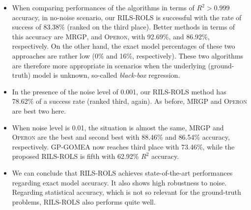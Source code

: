 \documentclass{bmcart}
\begin{document}
\begin{itemize}
	\item When comparing performances of the algorithms in terms of $R^2 > 0.999$ accuracy, in no-noise scenario, our \textsc{RILS}-\textsc{ROLS} is successful with the rate of success of 83.38\% (ranked on the third place). Better methods in terms of this accuracy are \textsc{MRGP}, and \textsc{Operon}, with 92.69\%, and 86.92\%, respectively. On the other hand, the exact model percentages of these two approaches are rather low (0\% and 16\%, respectively). These two algorithms are therefore more appropriate in scenarios when the underlying (ground-truth) model is unknown, so-called \emph{black-box} regression. 
	
	\item  In the presence of the noise level of 0.001, our \textsc{RILS-ROLS} method has 78.62\% of a success rate (ranked third, again).  As before, \textsc{MRGP} and \textsc{Operon} are best two here. 
	
	\item   When noise level is 0.01, the situation is almost the same, \textsc{MRGP} and \textsc{Operon} are the best and second best with 88.46\% and 86.54\% accuracy, respectively. \textsc{GP-GOMEA} now reaches third place with 73.46\%, while the proposed \textsc{RILS-ROLS} is fifth with 62.92\% $R^2$ accuracy.
	
	\item We can conclude that \textsc{RILS}-\textsc{ROLS} achieves state-of-the-art performances regarding exact model accuracy. It also shows high robustness to noise. Regarding statistical accuracy, which is not so relevant for the ground-truth problems, \textsc{RILS}-\textsc{ROLS} also performs quite well. 
	
\end{itemize}
\end{document}
